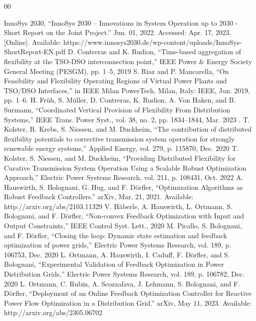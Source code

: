 \documentclass[conference,a4paper]{IEEEtran}
\begin{document}
\begin{thebibliography}{00}

 InnoSys 2030, “InnoSys 2030 – Innovations in System Operation up to 2030 - Short Report on the Joint Project.” Jun. 01, 2022. Accessed: Apr. 17, 2023. [Online]. Available: https://www.innosys2030.de/wp-content/uploads/InnoSys-ShortReport-EN.pdf
 D. Contreras and K. Rudion, “Time-based aggregation of flexibility at the TSO-DSO interconnection point,” IEEE Power \& Energy Society General Meeting (PESGM), pp. 1–5, 2019         
 S. Riaz and P. Mancarella, “On Feasibility and Flexibility Operating Regions of Virtual Power Plants and TSO/DSO Interfaces,” in IEEE Milan PowerTech, Milan, Italy: IEEE, Jun. 2019, pp. 1–6.
 H. Früh, S. Müller, D. Contreras, K. Rudion, A. Von Haken, and B. Surmann, “Coordinated Vertical Provision of Flexibility From Distribution Systems,” IEEE Trans. Power Syst., vol. 38, no. 2, pp. 1834–1844, Mar. 2023            .
 T. Kolster, R. Krebs, S. Niessen, and M. Duckheim, “The contribution of distributed flexibility potentials to corrective transmission system operation for strongly renewable energy systems,” Applied Energy, vol. 279, p. 115870, Dec. 2020
 T. Kolster, S. Niessen, and M. Duckheim, “Providing Distributed Flexibility for Curative Transmission System Operation Using a Scalable Robust Optimization Approach,” Electric Power Systems Research, vol. 211, p. 108431, Oct. 2022
 A. Hauswirth, S. Bolognani, G. Hug, and F. Dörfler, “Optimization Algorithms as Robust Feedback Controllers.” arXiv, Mar. 21, 2021. Available: http://arxiv.org/abs/2103.11329
 V. Häberle, A. Hauswirth, L. Ortmann, S. Bolognani, and F. Dörfler, “Non-convex Feedback Optimization with Input and Output Constraints,” IEEE Control Syst. Lett., 2020
 M. Picallo, S. Bolognani, and F. Dörfler, “Closing the loop: Dynamic state estimation and feedback optimization of power grids,” Electric Power Systems Research, vol. 189, p. 106753, Dec. 2020
 L. Ortmann, A. Hauswirth, I. Caduff, F. Dörfler, and S. Bolognani, “Experimental Validation of Feedback Optimization in Power Distribution Grids,” Electric Power Systems Research, vol. 189, p. 106782, Dec. 2020
 L. Ortmann, C. Rubin, A. Scozzafava, J. Lehmann, S. Bolognani, and F. Dörfler, “Deployment of an Online Feedback Optimization Controller for Reactive Power Flow Optimization in a Distribution Grid.” arXiv, May 11, 2023. Available: http://arxiv.org/abs/2305.06702

\end{thebibliography}
\end{document}

